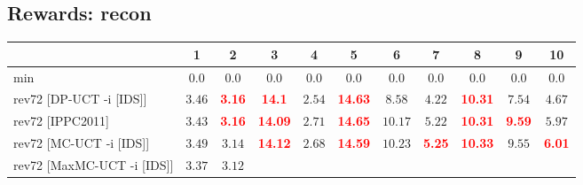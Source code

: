 \documentclass{article}
\begin{document}
\bigskip

\subsection*{Rewards: recon}

\begin{tabular}{|l|r@{$\pm$}rr@{$\pm$}rr@{$\pm$}rr@{$\pm$}rr@{$\pm$}rr@{$\pm$}rr@{$\pm$}rr@{$\pm$}rr@{$\pm$}rr@{$\pm$}r|}
\hline

& \multicolumn{2}{c}{1}
& \multicolumn{2}{c}{2}
& \multicolumn{2}{c}{3}
& \multicolumn{2}{c}{4}
& \multicolumn{2}{c}{5}
& \multicolumn{2}{c}{6}
& \multicolumn{2}{c}{7}
& \multicolumn{2}{c}{8}
& \multicolumn{2}{c}{9}
& \multicolumn{2}{c|}{10}
\\
\hline
\hline
min
& \multicolumn{2}{c}{$0.0$}
& \multicolumn{2}{c}{$0.0$}
& \multicolumn{2}{c}{$0.0$}
& \multicolumn{2}{c}{$0.0$}
& \multicolumn{2}{c}{$0.0$}
& \multicolumn{2}{c}{$0.0$}
& \multicolumn{2}{c}{$0.0$}
& \multicolumn{2}{c}{$0.0$}
& \multicolumn{2}{c}{$0.0$}
& \multicolumn{2}{c|}{$0.0$}
\\
rev72 [DP-UCT -i [IDS]]
& \multicolumn{2}{c}{$3.46$}
& \multicolumn{2}{c}{\textbf{\textcolor{red}{3.16}}}
& \multicolumn{2}{c}{\textbf{\textcolor{red}{14.1}}}
& \multicolumn{2}{c}{$2.54$}
& \multicolumn{2}{c}{\textbf{\textcolor{red}{14.63}}}
& \multicolumn{2}{c}{$8.58$}
& \multicolumn{2}{c}{$4.22$}
& \multicolumn{2}{c}{\textbf{\textcolor{red}{10.31}}}
& \multicolumn{2}{c}{$7.54$}
& \multicolumn{2}{c|}{$4.67$}
\\
rev72 [IPPC2011]
& \multicolumn{2}{c}{$3.43$}
& \multicolumn{2}{c}{\textbf{\textcolor{red}{3.16}}}
& \multicolumn{2}{c}{\textbf{\textcolor{red}{14.09}}}
& \multicolumn{2}{c}{$2.71$}
& \multicolumn{2}{c}{\textbf{\textcolor{red}{14.65}}}
& \multicolumn{2}{c}{$10.17$}
& \multicolumn{2}{c}{$5.22$}
& \multicolumn{2}{c}{\textbf{\textcolor{red}{10.31}}}
& \multicolumn{2}{c}{\textbf{\textcolor{red}{9.59}}}
& \multicolumn{2}{c|}{$5.97$}
\\
rev72 [MC-UCT -i [IDS]]
& \multicolumn{2}{c}{$3.49$}
& \multicolumn{2}{c}{$3.14$}
& \multicolumn{2}{c}{\textbf{\textcolor{red}{14.12}}}
& \multicolumn{2}{c}{$2.68$}
& \multicolumn{2}{c}{\textbf{\textcolor{red}{14.59}}}
& \multicolumn{2}{c}{$10.23$}
& \multicolumn{2}{c}{\textbf{\textcolor{red}{5.25}}}
& \multicolumn{2}{c}{\textbf{\textcolor{red}{10.33}}}
& \multicolumn{2}{c}{$9.55$}
& \multicolumn{2}{c|}{\textbf{\textcolor{red}{6.01}}}
\\
rev72 [MaxMC-UCT -i [IDS]]
& \multicolumn{2}{c}{$3.37$}
& \multicolumn{2}{c}{$3.12$}

\end{tabular}
\end{document}
